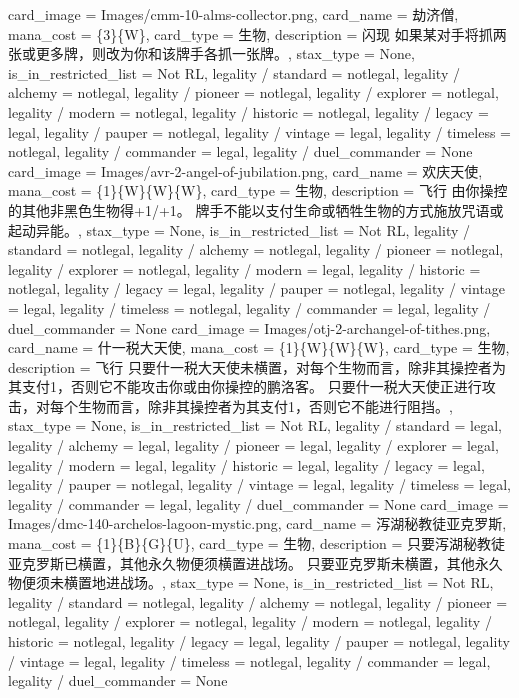 \documentclass[lang = cn, color = black, 10pt]{AllThatStax}
\begin{document}
\card
{
	card_image = Images/cmm-10-alms-collector.png,
	card_name = 劫济僧,
	mana_cost = \{3\}\{W\},
	card_type = 生物,
	description = 闪现
	如果某对手将抓两张或更多牌，则改为你和该牌手各抓一张牌。,
	stax_type = None,
	is_in_restricted_list = Not RL,
	legality / standard = notlegal,
	legality / alchemy = notlegal,
	legality / pioneer = notlegal,
	legality / explorer = notlegal,
	legality / modern = notlegal,
	legality / historic = notlegal,
	legality / legacy = legal,
	legality / pauper = notlegal,
	legality / vintage = legal,
	legality / timeless = notlegal,
	legality / commander = legal,
	legality / duel_commander = None
}
\card
{
	card_image = Images/avr-2-angel-of-jubilation.png,
	card_name = 欢庆天使,
	mana_cost = \{1\}\{W\}\{W\}\{W\},
	card_type = 生物,
	description = 飞行
	由你操控的其他非黑色生物得+1/+1。
	牌手不能以支付生命或牺牲生物的方式施放咒语或起动异能。,
	stax_type = None,
	is_in_restricted_list = Not RL,
	legality / standard = notlegal,
	legality / alchemy = notlegal,
	legality / pioneer = notlegal,
	legality / explorer = notlegal,
	legality / modern = legal,
	legality / historic = notlegal,
	legality / legacy = legal,
	legality / pauper = notlegal,
	legality / vintage = legal,
	legality / timeless = notlegal,
	legality / commander = legal,
	legality / duel_commander = None
}
\card
{
	card_image = Images/otj-2-archangel-of-tithes.png,
	card_name = 什一税大天使,
	mana_cost = \{1\}\{W\}\{W\}\{W\},
	card_type = 生物,
	description = 飞行
	只要什一税大天使未横置，对每个生物而言，除非其操控者为其支付{1}，否则它不能攻击你或由你操控的鹏洛客。
	只要什一税大天使正进行攻击，对每个生物而言，除非其操控者为其支付{1}，否则它不能进行阻挡。,
	stax_type = None,
	is_in_restricted_list = Not RL,
	legality / standard = legal,
	legality / alchemy = legal,
	legality / pioneer = legal,
	legality / explorer = legal,
	legality / modern = legal,
	legality / historic = legal,
	legality / legacy = legal,
	legality / pauper = notlegal,
	legality / vintage = legal,
	legality / timeless = legal,
	legality / commander = legal,
	legality / duel_commander = None
}
\card
{
	card_image = Images/dmc-140-archelos-lagoon-mystic.png,
	card_name = 泻湖秘教徒亚克罗斯,
	mana_cost = \{1\}\{B\}\{G\}\{U\},
	card_type = 生物,
	description = 只要泻湖秘教徒亚克罗斯已横置，其他永久物便须横置进战场。
	只要亚克罗斯未横置，其他永久物便须未横置地进战场。,
	stax_type = None,
	is_in_restricted_list = Not RL,
	legality / standard = notlegal,
	legality / alchemy = notlegal,
	legality / pioneer = notlegal,
	legality / explorer = notlegal,
	legality / modern = notlegal,
	legality / historic = notlegal,
	legality / legacy = legal,
	legality / pauper = notlegal,
	legality / vintage = legal,
	legality / timeless = notlegal,
	legality / commander = legal,
	legality / duel_commander = None
}
\end{document}
